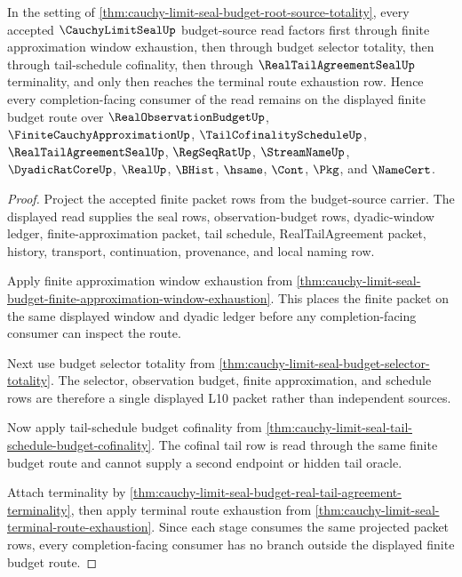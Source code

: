 \begin{theorem}
\label{thm:cauchy-limit-seal-budget-source-factorization}
In the setting of \autoref{thm:cauchy-limit-seal-budget-root-source-totality}, every accepted $\CauchyLimitSealUp$ budget-source read factors first through finite approximation window exhaustion, then through budget selector totality, then through tail-schedule cofinality, then through $\RealTailAgreementSealUp$ terminality, and only then reaches the terminal route exhaustion row. Hence every completion-facing consumer of the read remains on the displayed finite budget route over $\RealObservationBudgetUp$, $\FiniteCauchyApproximationUp$, $\TailCofinalityScheduleUp$, $\RealTailAgreementSealUp$, $\RegSeqRatUp$, $\StreamNameUp$, $\DyadicRatCoreUp$, $\RealUp$, $\BHist$, $\hsame$, $\Cont$, $\Pkg$, and $\NameCert$.
\end{theorem}
\begin{proof}
Project the accepted finite packet rows from the budget-source carrier. The displayed read supplies the seal rows, observation-budget rows, dyadic-window ledger, finite-approximation packet, tail schedule, RealTailAgreement packet, history, transport, continuation, provenance, and local naming row.

Apply finite approximation window exhaustion from \autoref{thm:cauchy-limit-seal-budget-finite-approximation-window-exhaustion}. This places the finite packet on the same displayed window and dyadic ledger before any completion-facing consumer can inspect the route.

Next use budget selector totality from \autoref{thm:cauchy-limit-seal-budget-selector-totality}. The selector, observation budget, finite approximation, and schedule rows are therefore a single displayed L10 packet rather than independent sources.

Now apply tail-schedule budget cofinality from \autoref{thm:cauchy-limit-seal-tail-schedule-budget-cofinality}. The cofinal tail row is read through the same finite budget route and cannot supply a second endpoint or hidden tail oracle.

Attach terminality by \autoref{thm:cauchy-limit-seal-budget-real-tail-agreement-terminality}, then apply terminal route exhaustion from \autoref{thm:cauchy-limit-seal-terminal-route-exhaustion}. Since each stage consumes the same projected packet rows, every completion-facing consumer has no branch outside the displayed finite budget route.
\end{proof}

